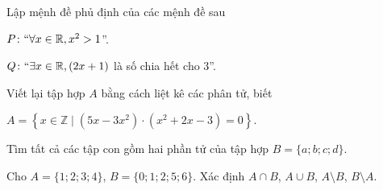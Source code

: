 

\begin{bt}%
	Lập mệnh đề phủ định của các mệnh đề sau
	\begin{listEX}[1]
		\item $P\colon``\forall x \in \mathbb{R}, x^2>1$''.
		\item $Q\colon``\exists x \in \mathbb{R}, (2x+1)$ là số chia hết cho $3$''.
	\end{listEX}
\end{bt}

\begin{bt}%
	Viết lại tập hợp $A$ bằng cách liệt kê các phân tử, biết
	
	$A=\left\{x \in \mathbb{Z} \mid\left(5 x-3 x^2\right) \cdot\left(x^2+2 x-3\right)=0\right\}$.
\end{bt}

\begin{bt}%
	Tìm tất cả các tập con gồm hai phần tử của tập hợp $B=\{a ; b ; c ; d\}$.
\end{bt}

\begin{bt}%
	Cho $A=\{1 ; 2 ; 3 ; 4\}$, $B=\{0 ; 1 ; 2 ; 5 ; 6\}$. Xác định $A \cap B$, $A \cup B$, $A \setminus  B$, $B \setminus  A$.
\end{bt}

